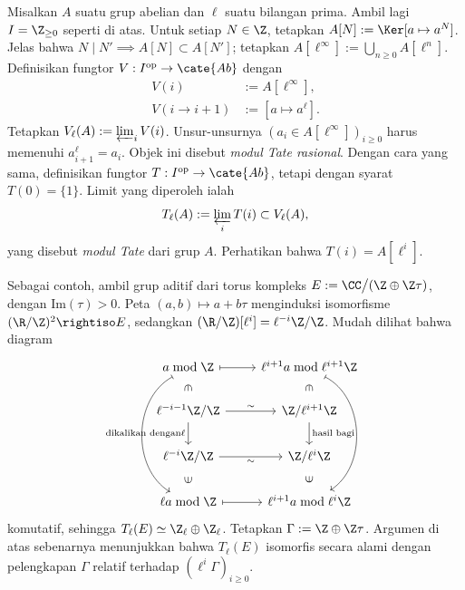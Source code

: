 \begin{example}
	Misalkan $A$ suatu grup abelian dan $\ell$ suatu bilangan prima. Ambil lagi $I = \Z_{\geq 0}$ seperti di atas. Untuk setiap $N \in \Z$, tetapkan $A[N] := \Ker[a \mapsto a^N]$. Jelas bahwa $N \mid N' \implies A[N] \subset A[N']$; tetapkan $A[\ell^\infty] := \bigcup_{n \geq 0} A[\ell^n]$. Definisikan fungtor $V: I^\text{op} \to \cate{Ab}$ dengan
	\begin{align*}
		V(i) & := A[\ell^\infty], \\
		V(i \to i+1) & := [a \mapsto a^\ell].
	\end{align*}
	Tetapkan $V_\ell(A) := \varprojlim_i V(i)$. Unsur-unsurnya $(a_i \in A[\ell^\infty])_{i \geq 0}$ harus memenuhi $a_{i+1}^\ell = a_i$. Objek ini disebut \emph{modul Tate rasional}. Dengan cara yang sama, definisikan fungtor $T: I^\text{op} \to \cate{Ab}$, tetapi dengan syarat $T(0) = \{1\}$. Limit yang diperoleh ialah
	\[ T_\ell(A) := \varprojlim_i T(i) \subset V_\ell(A), \]
	yang disebut \emph{modul Tate} dari grup $A$. Perhatikan bahwa $T(i) = A[\ell^i]$.

Sebagai contoh, ambil grup aditif dari torus kompleks $E := \CC \big/(\Z \oplus \Z\tau)$, dengan $\text{Im}(\tau) > 0$. Peta $(a,b) \mapsto a+b\tau$ menginduksi isomorfisme $(\R/\Z)^2 \rightiso E$, sedangkan $(\R/\Z)[\ell^i] = \ell^{-i}\Z/\Z$. Mudah dilihat bahwa diagram
	\[ \begin{tikzcd}
		a \bmod \Z \arrow[mapsto]{r} \arrow[mapsto, bend right=60]{ddd} \arrow[phantom, d, sloped, "\in" description] & \ell^{i+1}a \bmod \ell^{i+1} \Z \arrow[mapsto, bend left=60]{ddd} \arrow[phantom, d, sloped, "\in" description] \\
		\ell^{-i-1}\Z/\Z \arrow[d, "{\text{dikalikan dengan} \ell}"'] \arrow[r, "\sim"] & \Z/\ell^{i+1} \Z \arrow[d, "{\text{hasil bagi}}"] \\
		\ell^{-i}\Z/\Z \arrow[r, "\sim"'] & \Z/\ell^i \Z \\
		\ell a \bmod \Z \arrow[mapsto]{r} \arrow[phantom, u, sloped, "\in" description] & \ell^{i+1} a \bmod \ell^i \Z \arrow[phantom, u, sloped, "\in" description]
	\end{tikzcd} \]
komutatif, sehingga $T_\ell(E) \simeq \Z_\ell \oplus \Z_\ell$. Tetapkan $\Gamma := \Z \oplus \Z\tau$. Argumen di atas sebenarnya menunjukkan bahwa $T_\ell(E)$ isomorfis secara alami dengan pelengkapan $\Gamma$ relatif terhadap $(\ell^i \Gamma)_{i \geq 0}$.


\end{example}
